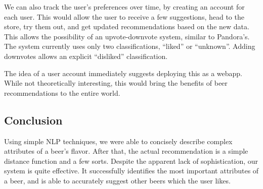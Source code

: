 \documentclass[11pt]{article}
\begin{document}
We can also track the user's preferences over time, by creating an account for each user. This would allow the user to receive a few suggestions, head to the store, try them out, and get updated recommendations based on the new data. This allows the possibility of an upvote-downvote system, similar to Pandora's. The system currently uses only two classifications, ``liked'' or ``unknown''. Adding downvotes allows an explicit ``disliked'' classification.

The idea of a user account immediately suggests deploying this as a webapp. While not theoretically interesting, this would bring the benefits of beer recommendations to the entire world.
\subsection*{Conclusion}
Using simple NLP techniques, we were able to concisely describe complex attributes of a beer's flavor. After that, the actual recommendation is a simple distance function and a few sorts. Despite the apparent lack of sophistication, our system is quite effective. It successfully identifies the most important attributes of a beer, and is able to accurately suggest other beers which the user likes.
\end{document}
